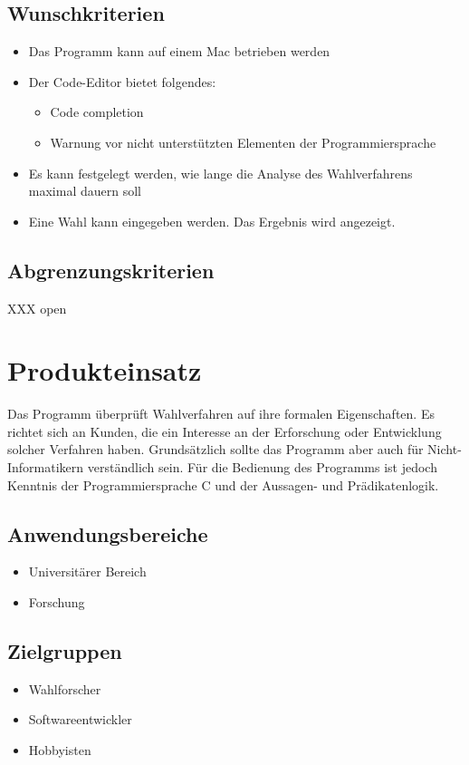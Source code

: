 \documentclass[a4paper]{scrreprt}
\begin{document}
\section{Wunschkriterien}
\begin{itemize}
\item Das Programm kann auf einem Mac betrieben werden
\item Der Code-Editor bietet folgendes:
	\begin{itemize}
	\item Code completion
	\item Warnung vor nicht unterstützten Elementen der Programmiersprache
	\end{itemize}
\item Es kann festgelegt werden, wie lange die Analyse des Wahlverfahrens maximal dauern soll
\item Eine Wahl kann eingegeben werden. Das Ergebnis wird angezeigt.
\end{itemize}

\section{Abgrenzungskriterien}
 XXX open



\chapter{Produkteinsatz}
Das Programm überprüft Wahlverfahren auf ihre formalen Eigenschaften. Es richtet sich an Kunden, die ein Interesse an der Erforschung oder Entwicklung solcher Verfahren haben. Grundsätzlich sollte das Programm aber auch für Nicht-Informatikern verständlich sein. Für die Bedienung des Programms ist jedoch Kenntnis der Programmiersprache C und der Aussagen- und Prädikatenlogik.

\section{Anwendungsbereiche}
\begin{itemize}
\item Universitärer Bereich
\item Forschung
\end{itemize}

\section{Zielgruppen}
\begin{itemize}
\item Wahlforscher
\item Softwareentwickler
\item Hobbyisten
\end{itemize}
\end{document}
